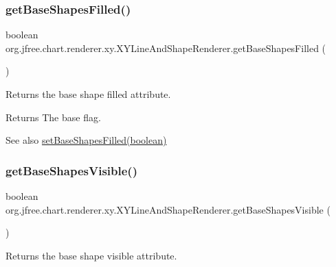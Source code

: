 \subsubsection{\texorpdfstring{get\+Base\+Shapes\+Filled()}{getBaseShapesFilled()}}
{\footnotesize\ttfamily boolean org.\+jfree.\+chart.\+renderer.\+xy.\+X\+Y\+Line\+And\+Shape\+Renderer.\+get\+Base\+Shapes\+Filled (\begin{DoxyParamCaption}{ }\end{DoxyParamCaption})}

Returns the base \textquotesingle{}shape filled\textquotesingle{} attribute.

\begin{DoxyReturn}{Returns}
The base flag.
\end{DoxyReturn}
\begin{DoxySeeAlso}{See also}
\mbox{\hyperlink{classorg_1_1jfree_1_1chart_1_1renderer_1_1xy_1_1_x_y_line_and_shape_renderer_a74d993dd9113df3bcf97bf8ef533ae35}{set\+Base\+Shapes\+Filled(boolean)}} 
\end{DoxySeeAlso}
\mbox{\label{classorg_1_1jfree_1_1chart_1_1renderer_1_1xy_1_1_x_y_line_and_shape_renderer_a5aebca1dfd44e8f4a0a9dee475b5f2f8}} 
\subsubsection{\texorpdfstring{get\+Base\+Shapes\+Visible()}{getBaseShapesVisible()}}
{\footnotesize\ttfamily boolean org.\+jfree.\+chart.\+renderer.\+xy.\+X\+Y\+Line\+And\+Shape\+Renderer.\+get\+Base\+Shapes\+Visible (\begin{DoxyParamCaption}{ }\end{DoxyParamCaption})}

Returns the base \textquotesingle{}shape visible\textquotesingle{} attribute.

